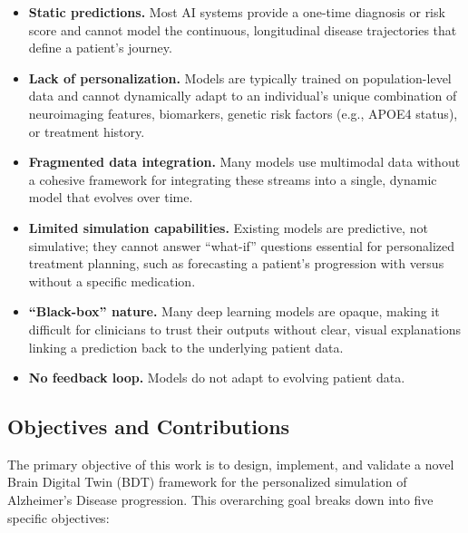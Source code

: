 \documentclass[pdflatex,sn-mathphys-num]{sn-jnl}%
\providecommand{\tightlist}{%
  \setlength{\itemsep}{0pt}\setlength{\parskip}{0pt}}%
\theoremstyle{thmstyleone}%
\theoremstyle{thmstyletwo}%
\theoremstyle{thmstylethree}%
\begin{document}
\begin{itemize}

\tightlist
\item
  \textbf{Static predictions.} Most AI systems provide a one-time
  diagnosis or risk score and cannot model the continuous, longitudinal
  disease trajectories that define a patient's journey.
\item
  \textbf{Lack of personalization.} Models are typically trained on
  population-level data and cannot dynamically adapt to an individual's
  unique combination of neuroimaging features, biomarkers, genetic risk
  factors (e.g., APOE4 status), or treatment history.
\item
  \textbf{Fragmented data integration.} Many models use multimodal data
  without a cohesive framework for integrating these streams into a
  single, dynamic model that evolves over time.
\item
  \textbf{Limited simulation capabilities.} Existing models are
  predictive, not simulative; they cannot answer ``what-if'' questions
  essential for personalized treatment planning, such as forecasting a
  patient's progression with versus without a specific medication.
\item
  \textbf{``Black-box'' nature.} Many deep learning models are opaque,
  making it difficult for clinicians to trust their outputs without
  clear, visual explanations linking a prediction back to the underlying
  patient data.
\item
  \textbf{No feedback loop.} Models do not adapt to evolving patient
  data.
\end{itemize}

\subsection{Objectives and
Contributions}\label{objectives-and-contributions}

The primary objective of this work is to design, implement, and validate
a novel Brain Digital Twin (BDT) framework for the personalized
simulation of Alzheimer's Disease progression. This overarching goal
breaks down into five specific objectives:
\end{document}
